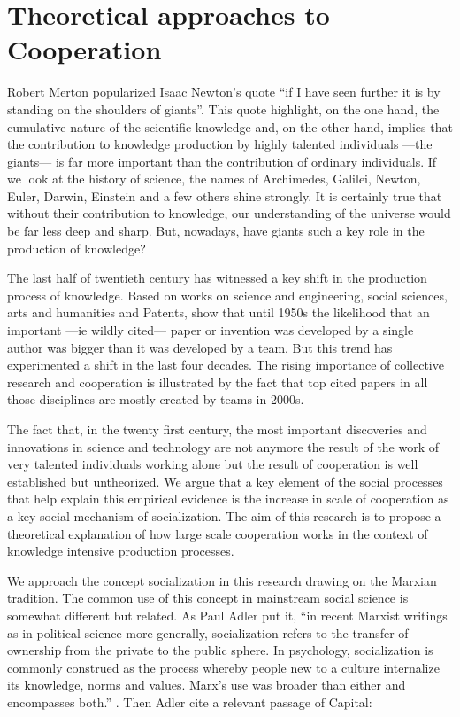 \chapter{Theoretical approaches to Cooperation}
\label{intro}

Robert Merton popularized Isaac Newton's quote ``if I have seen further it is by standing on the shoulders of giants''. This quote highlight, on the one hand, the cumulative nature of the scientific knowledge and, on the other hand, implies that the contribution to knowledge production by highly talented individuals ---the giants--- is far more important than the contribution of ordinary individuals. If we look at the history of science, the names of Archimedes, Galilei, Newton, Euler, Darwin, Einstein and a few others shine strongly. It is certainly true that without their contribution to knowledge, our understanding of the universe would be far less deep and sharp. But, nowadays, have giants such a key role in the production of knowledge?  

The last half of twentieth century has witnessed a key shift in the production process of knowledge. Based on works on science and engineering, social sciences, arts and humanities and Patents, \citet*{uzzi:2007a} show that until 1950s the likelihood that an important ---ie wildly cited--- paper or invention was developed by a single author was bigger than it was developed by a team. But this trend has experimented a shift in the last four decades. The rising importance of collective research and cooperation is illustrated by the fact that top cited papers in all those disciplines are mostly created by teams in 2000s.

The fact that, in the twenty first century, the most important discoveries and innovations in science and technology are not anymore the result of the work of very talented individuals working alone but the result of cooperation is well established but untheorized. We argue that a key element of the social processes that help explain this empirical evidence is the increase in scale of cooperation as a key social mechanism of socialization. The aim of this research is to propose a theoretical explanation of how large scale cooperation works in the context of knowledge intensive production processes.

We approach the concept socialization in this research drawing on the Marxian tradition. The common use of this concept in mainstream social science is somewhat different but related. As Paul Adler put it, ``in recent Marxist writings as in political science more generally, socialization refers to the transfer of ownership from the private to the public sphere. In psychology, socialization is commonly construed as the process whereby people new to a culture internalize its knowledge, norms and values. Marx's use was broader than either and encompasses both.'' \citep[1320]{adler:2007}. Then Adler cite a relevant passage of Capital: 

